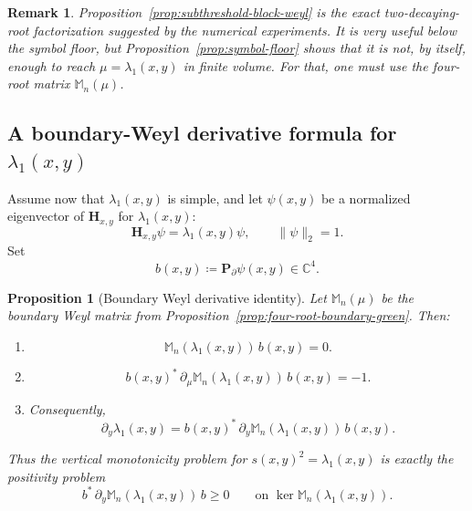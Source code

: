 \documentclass[11pt]{article}
\newtheorem{proposition}[theorem]{Proposition}
\newtheorem{remark}[theorem]{Remark}
\begin{document}
\begin{remark}
Proposition~\ref{prop:subthreshold-block-weyl} is the exact two-decaying-root factorization
suggested by the numerical experiments. It is very useful below the symbol floor, but
Proposition~\ref{prop:symbol-floor} shows that it is not, by itself, enough to reach
\(\mu=\lambda_1(x,y)\) in finite volume. For that, one must use the four-root matrix
\(\mathbb M_n(\mu)\).
\end{remark}

\subsection*{A boundary-Weyl derivative formula for \(\lambda_1(x,y)\)}

Assume now that \(\lambda_1(x,y)\) is simple, and let \(\psi(x,y)\) be a normalized eigenvector of
\(\mathbf H_{x,y}\) for \(\lambda_1(x,y)\):
\[
\mathbf H_{x,y}\psi=\lambda_1(x,y)\psi,
\qquad
\|\psi\|_2=1.
\]
Set
\[
b(x,y)\coloneqq \mathbf P_\partial \psi(x,y)\in\mathbb C^4.
\]

\begin{proposition}[Boundary Weyl derivative identity]\label{prop:boundary-weyl-derivative}
Let \(\mathbb M_n(\mu)\) be the boundary Weyl matrix from
Proposition~\ref{prop:four-root-boundary-green}. Then:
\begin{enumerate}
\item
\[
\mathbb M_n(\lambda_1(x,y))\,b(x,y)=0.
\]
\item
\[
b(x,y)^*\,\partial_\mu \mathbb M_n(\lambda_1(x,y))\,b(x,y)=-1.
\]
\item Consequently,
\[
\boxed{
\partial_y \lambda_1(x,y)
=
b(x,y)^*\,\partial_y \mathbb M_n(\lambda_1(x,y))\,b(x,y).
}
\]
\end{enumerate}
Thus the vertical monotonicity problem for \(s(x,y)^2=\lambda_1(x,y)\) is exactly the
positivity problem
\[
b^*\,\partial_y \mathbb M_n(\lambda_1(x,y))\,b\ge 0
\qquad
\text{on }\ker \mathbb M_n(\lambda_1(x,y)).
\]
\end{proposition}
\end{document}
